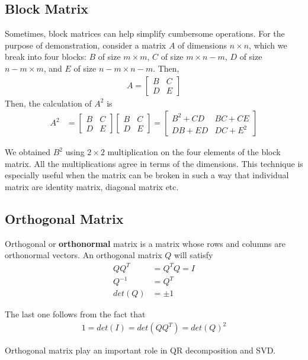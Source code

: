 \documentclass[../../linear_algebra.tex]{subfiles}
\begin{document}
\subsection{Block Matrix}
Sometimes, block matrices can help simplify cumbersome operations. For the purpose of demonstration, consider a matrix $A$ of dimensions $n \times n$, which we break into four blocks: $B$ of size $m \times m$, $C$ of size $m \times n-m$, $D$ of size $n-m \times m$, and $E$ of size $n-m \times n-m$. Then,
\begin{align*}
    A = \begin{bmatrix}
        B &C\\ D &E
    \end{bmatrix}
\end{align*}
Then, the calculation of $A^{2}$ is
\begin{align*}
    A^{2} &= \begin{bmatrix}
        B &C\\ D &E
    \end{bmatrix}
    \begin{bmatrix}
        B &C\\ D &E
    \end{bmatrix} =
    \begin{bmatrix}
        B^{2} + CD &BC + CE\\ DB + ED &DC + E^{2}
    \end{bmatrix}
\end{align*}

We obtained $B^{2}$ using $2 \times 2$ multiplication on the four elements of the block matrix. All the multiplications agree in terms of the dimensions. This technique is especially useful when the matrix can be broken in such a way that individual matrix are identity matrix, diagonal matrix etc.

\subsection{Orthogonal Matrix}
Orthogonal or \textbf{orthonormal} matrix is a matrix whose rows and columns are orthonormal vectors. An orthogonal matrix $Q$ will satisfy
\begin{align*}
    QQ^{T} &= Q^{T}Q = I\\
    Q^{-1} &= Q^{T}\\
    det(Q) &= \pm 1
\end{align*}

The last one follows from the fact that
\begin{align*}
    1 = det(I) = det(QQ^{T}) = det(Q)^{2}
\end{align*}

Orthogonal matrix play an important role in QR decomposition and SVD.
\end{document}
